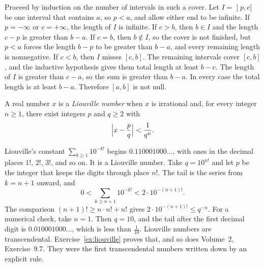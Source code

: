 Proceed by induction on the number of intervals in such a cover. Let $I=\mathopen]p,c[$ be one interval that contains $a$, so $p<a$, and allow either end to be infinite. If $p=-\infty$ or $c=+\infty$, the length of $I$ is infinite. If $c>b$, then $b\in I$ and the length $c-p$ is greater than $b-a$. If $c=b$, then $b\notin I$, so the cover is not finished, but $p<a$ forces the length $b-p$ to be greater than $b-a$, and every remaining length is nonnegative. If $c<b$, then $I$ misses $[c,b]$. The remaining intervals cover $[c,b]$, and the inductive hypothesis gives them total length at least $b-c$. The length of $I$ is greater than $c-a$, so the sum is greater than $b-a$. In every case the total length is at least $b-a$. Therefore $[a,b]$ is not null.

\begin{definition}
A real number $x$ is a \emph{Liouville number} when $x$ is irrational and, for every integer $n\ge1$, there exist integers $p$ and $q\ge2$ with
\[\Bigl|x-\frac pq\Bigr|<\frac1{q^n}.\]
\end{definition}

Liouville's constant $\sum_{k\ge1}10^{-k!}$ begins $0.110001000\ldots$, with ones in the decimal places $1!$, $2!$, $3!$, and so on. It is a Liouville number. Take $q=10^{n!}$ and let $p$ be the integer that keeps the digits through place $n!$. The tail is the series from $k=n+1$ onward, and
\[0<\sum_{k\ge n+1}10^{-k!}<2\cdot10^{-(n+1)!}.\]
The comparison $(n+1)!\ge n\cdot n!+n!$ gives $2\cdot10^{-(n+1)!}\le q^{-n}$. For a numerical check, take $n=1$. Then $q=10$, and the tail after the first decimal digit is $0.010001000\ldots$, which is less than $\frac1{10}$. Liouville numbers are transcendental. Exercise~\ref{ex:liouville} proves that, and so does Volume~2, Exercise~9.7. They were the first transcendental numbers written down by an explicit rule.

